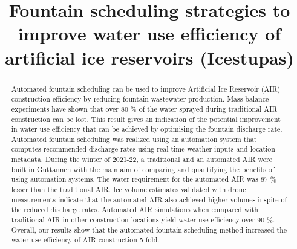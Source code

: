\documentclass[tc, manuscript]{copernicus}
\begin{document}
\title{Fountain scheduling strategies to improve water use efficiency of artificial
ice reservoirs (Icestupas)}




\def\Authors{Suryanarayanan Balasubramanian\,$^{1}$, Roger Waser\,$^{2}$, Martin Hoelzle\,$^{1}$}
\def\Address{$^{1}$University of Fribourg, Department of Geosciences, Fribourg, Switzerland $^{2}$University of
Applied Sciences and Arts, Luzern, Switzerland} \def\corrAuthor{Suryanarayanan Balasubramanian}






\maketitle

\begin{abstract}

  Automated fountain scheduling can be used to improve Artificial Ice Reservoir (AIR) construction efficiency by
  reducing fountain wastewater production. Mass balance experiments have shown that over 80 \% of the water
  sprayed during traditional AIR construction can be lost. This result gives an indication of the potential
  improvement in water use efficiency that can be achieved by optimising the fountain discharge rate. Automated
  fountain scheduling was realized using an automation system that computes recommended discharge rates using
  real-time weather inputs and location metadata. During the winter of 2021-22, a traditional and an automated
  AIR were built in Guttannen with the main aim of comparing and quantifying the benefits of using automation
  systems. The water requirement for the automated AIR was 87 \% lesser than the traditional AIR. Ice volume
  estimates validated with drone measurements indicate that the automated AIR also achieved higher volumes
  inspite of the reduced discharge rates. Automated AIR simulations when compared with traditional AIR in other
  construction locations yield water use efficiency over 90 \%. Overall, our results show that the automated
  fountain scheduling method increased the water use efficiency of AIR construction 5 fold.

\end{abstract}
\end{document}
